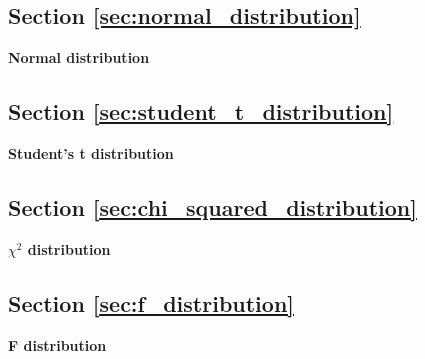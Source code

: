\subsection{Section \ref{sec:normal_distribution}}

\begin{exercise}
\label{ex:norm}

\textbf{Normal distribution} 





\end{exercise}

\subsection{Section \ref{sec:student_t_distribution}}

\begin{exercise}
\label{ex:student}

\textbf{Student's t distribution} 



\end{exercise}

\subsection{Section \ref{sec:chi_squared_distribution}}

\begin{exercise}
\label{ex:chisq}

\textbf{\texorpdfstring{$\chi^2$}{chi-squared} distribution} 





\end{exercise}

\subsection{Section \ref{sec:f_distribution}}

\begin{exercise}
\label{ex:fdist}

\textbf{F distribution} 





\end{exercise}

